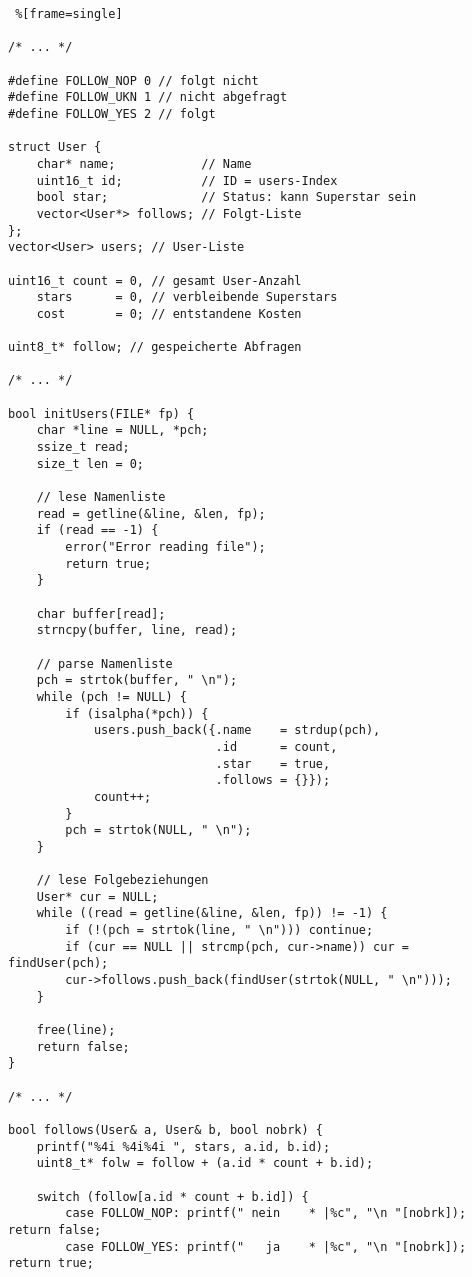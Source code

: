 \documentclass[a4paper,10pt,ngerman]{scrartcl}
\begin{document}
\begin{lstlisting} %[frame=single]

/* ... */

#define FOLLOW_NOP 0 // folgt nicht
#define FOLLOW_UKN 1 // nicht abgefragt
#define FOLLOW_YES 2 // folgt

struct User {
    char* name;            // Name
    uint16_t id;           // ID = users-Index
    bool star;             // Status: kann Superstar sein
    vector<User*> follows; // Folgt-Liste
};
vector<User> users; // User-Liste

uint16_t count = 0, // gesamt User-Anzahl
    stars      = 0, // verbleibende Superstars
    cost       = 0; // entstandene Kosten

uint8_t* follow; // gespeicherte Abfragen

/* ... */

bool initUsers(FILE* fp) {
    char *line = NULL, *pch;
    ssize_t read;
    size_t len = 0;

    // lese Namenliste
    read = getline(&line, &len, fp);
    if (read == -1) {
        error("Error reading file");
        return true;
    }

    char buffer[read];
    strncpy(buffer, line, read);

    // parse Namenliste
    pch = strtok(buffer, " \n");
    while (pch != NULL) {
        if (isalpha(*pch)) {
            users.push_back({.name    = strdup(pch),
                             .id      = count,
                             .star    = true,
                             .follows = {}});
            count++;
        }
        pch = strtok(NULL, " \n");
    }

    // lese Folgebeziehungen
    User* cur = NULL;
    while ((read = getline(&line, &len, fp)) != -1) {
        if (!(pch = strtok(line, " \n"))) continue;
        if (cur == NULL || strcmp(pch, cur->name)) cur = findUser(pch);
        cur->follows.push_back(findUser(strtok(NULL, " \n")));
    }

    free(line);
    return false;
}

/* ... */

bool follows(User& a, User& b, bool nobrk) {
    printf("%4i %4i%4i ", stars, a.id, b.id);
    uint8_t* folw = follow + (a.id * count + b.id);

    switch (follow[a.id * count + b.id]) {
        case FOLLOW_NOP: printf(" nein    * |%c", "\n "[nobrk]); return false;
        case FOLLOW_YES: printf("   ja    * |%c", "\n "[nobrk]); return true;


\end{lstlisting}
\end{document}
